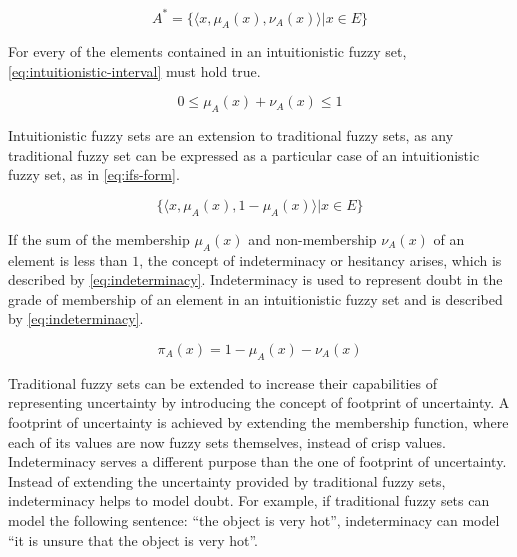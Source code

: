 \documentclass[review]{elsarticle}
\begin{document}
\begin{equation}
  \label{eq:ifs-definition}
  A^{*} = \{\langle x, \mu _{A} (x), \nu _{A} (x) \rangle | x \in E\}
\end{equation}

For every of the elements contained in an intuitionistic fuzzy set, \ref{eq:intuitionistic-interval} must hold true.

\begin{equation}
  \label{eq:intuitionistic-interval}
  0 \leq \mu_{A}(x) + \nu_{A}(x) \leq 1
\end{equation}

Intuitionistic fuzzy sets are an extension to traditional fuzzy sets, as any traditional fuzzy set can be expressed as a particular case of an intuitionistic fuzzy set, as in \ref{eq:ifs-form}.

\begin{equation}
  \label{eq:ifs-form}
  \{ \langle x, \mu_{A}(x), 1 - \mu_{A}(x) \rangle | x \in E \}
\end{equation}

If the sum of the membership $\mu_{A}(x)$ and non-membership $\nu_{A}(x)$ of an element is less than $1$, the concept of indeterminacy or hesitancy arises, which is described by \ref{eq:indeterminacy}. Indeterminacy is used to represent doubt in the grade of membership of an element in an intuitionistic fuzzy set and is described by \ref{eq:indeterminacy}.

\begin{equation}
  \label{eq:indeterminacy}
  \pi_{A}(x) = 1 - \mu_{A}(x) - \nu_{A}(x)
\end{equation}

Traditional fuzzy sets can be extended to increase their capabilities of representing uncertainty by introducing the concept of footprint of uncertainty. A footprint of uncertainty is achieved by extending the membership function, where each of its values are now fuzzy sets themselves, instead of crisp values. Indeterminacy serves a different purpose than the one of footprint of uncertainty. Instead of extending the uncertainty provided by traditional fuzzy sets, indeterminacy helps to model doubt. For example, if traditional fuzzy sets can model the following sentence: ``the object is very hot'', indeterminacy can model ``it is unsure that the object is very hot''.
\end{document}
